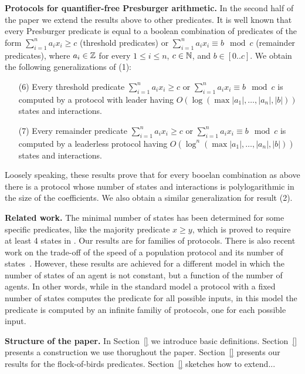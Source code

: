 \medskip\noindent \textbf{Protocols for quantifier-free Presburger arithmetic.} In the second half of the paper we extend the results above to other predicates. It is well known that every Presburger predicate is equal to a boolean combination of predicates of the form $\sum_{i=1}^n a_i x_i \geq c$ (threshold predicates)  or $\sum_{i=1}^n a_i x_i \equiv b \mod c$ (remainder predicates), where $a_i \in \mathbb{Z}$ for every $1 \leq i \leq n$, $c \in \mathbb{N}$, and $b \in [0..c]$. We obtain the following generalizations of (1):
\begin{itemize}
\item[(6)] Every threshold predicate $\sum_{i=1}^n a_i x_i \geq c$ or  $\sum_{i=1}^n a_i x_i \equiv b \mod c$ is computed by a protocol with leader having $O( \log(\max{|a_1|, \ldots, |a_n|, |b|}))$ states and interactions.
\item[(7)] Every remainder predicate $\sum_{i=1}^n a_i x_i \geq c$ or  $\sum_{i=1}^n a_i x_i \equiv b \mod c$ is computed by a leaderless protocol  having $O( \log^n(\max{|a_1|, \ldots, |a_n|, |b|}))$ states and interactions.
\end{itemize}
Loosely speaking, these results prove that for every booelan combination as above there is a protocol whose number of states and interactions is polylogarithmic in the size of the coefficients. We also obtain a similar generalization for result (2).



\medskip\noindent \textbf{Related work.} The minimal number of states
has been determined for some specific predicates, like the majority
predicate $x \geq y$, which is proved to require at least 4 states in
\cite{}.  Our results are for families of protocols. There is also
recent work on the trade-off of the speed of a population protocol and
its number of states~\cite{AAEGR17}. However, these results are
achieved for a different model in which the number of states of an
agent is not constant, but a function of the number of agents. In
other words, while in the standard model a protocol with a fixed
number of states computes the predicate for all possible inputs, in
this model the predicate is computed by an infinite familiy of
protocols, one for each possible input.


\medskip\noindent \textbf{Structure of the paper.} In Section~\ref{}
we introduce basic definitions. Section~\ref{} presents a construction
we use thorughout the paper. Section~\ref{} presents our results for
the flock-of-birds predicates. Section~\ref{} sketches how to extend...

